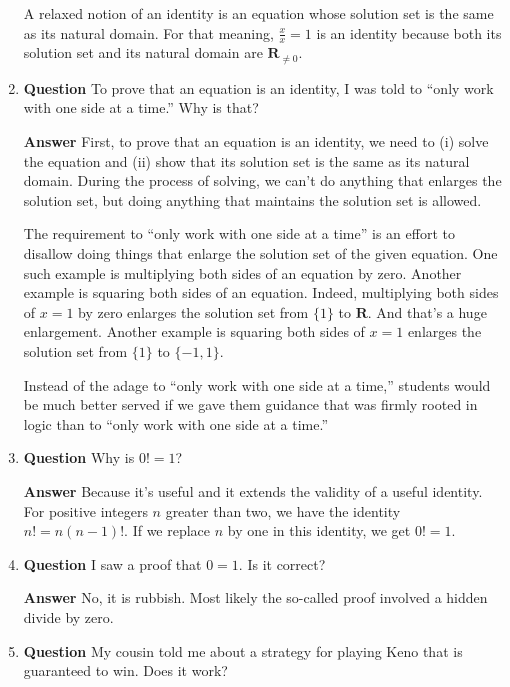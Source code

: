 \documentclass[12pt]{article}
\newcommand{\reals}{\mathbf{R}}
\newcounter{ex}\setcounter{ex}{0}
\begin{document}
\begin{enumerate}
\quad A relaxed notion of an identity is an equation whose
solution set is the same as its natural domain. For that meaning, \(\displaystyle \frac{x}{x} = 1\)
is an identity because both its solution set and its natural domain are \(\reals_{\neq 0}\).

\item \textbf{Question} To prove that an equation is an identity, I was
 told to ``only work with one side at a time.'' Why is that?

 \textbf{Answer} First, to prove that an equation is an identity,
 we need to (i) solve the equation and (ii) show that its solution
 set is the same as its natural domain. During the process of solving,
 we can't do anything that enlarges the solution set, but doing anything
 that maintains the solution set is allowed.
 
 \quad The requirement to ``only work with one side at a time''
 is an effort to disallow doing things that enlarge the solution set of
 the given equation. One  such example is multiplying both sides of an equation by zero. Another
 example is squaring both sides of an equation. Indeed, multiplying
 both sides of \(x = 1\) by zero enlarges the solution set from \(\{1\}\)
to \(\reals\). And that's a huge enlargement.  Another example is squaring both sides of 
\(x=1\) enlarges the solution set from \(\{1\}\) to \(\{-1,1\}\).

\quad Instead of the adage to ``only work with one side at a time,'' 
students would be much better served if we gave them guidance that was firmly
rooted in logic than to ``only work with one side at a time.'' 

\item  \textbf{Question} Why is \(0! = 1\)?

 \textbf{Answer} Because it's useful and it extends the validity of a useful identity. For positive integers \(n\) greater than two, we 
 have the identity \(n! = n (n-1)!\). If we replace \(n\) by one in this identity, 
 we get \(0! = 1\). 

\item  \textbf{Question} I saw a proof that \(0=1\).  Is it correct?

  \textbf{Answer}  No, it is rubbish. Most likely the so-called proof involved a hidden divide by zero.



\item  \textbf{Question} My cousin told me about a strategy for playing Keno that is guaranteed to win. Does it work?


\end{enumerate}
\end{document}
